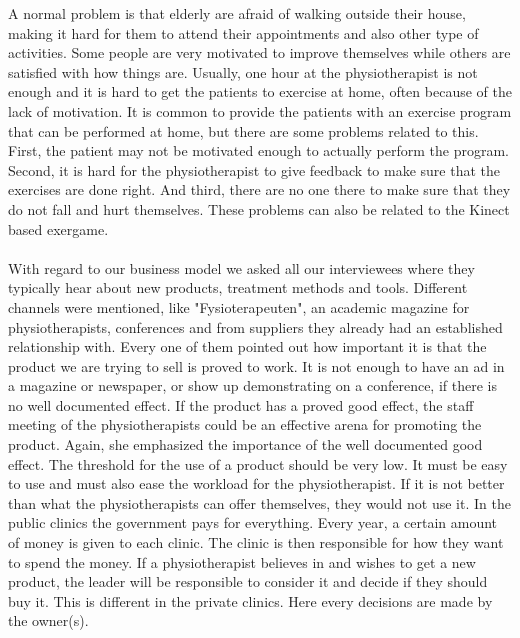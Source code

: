 A normal problem is that elderly are afraid of walking outside their house, making it hard for them to attend their appointments and also other type of activities. Some people are very motivated to improve themselves while others are satisfied with how things are. Usually, one hour at the physiotherapist is not enough and it is hard to get the patients to exercise at home, often because of the lack of motivation. It is common to provide the patients with an exercise program that can be performed at home, but there are some problems related to this. First, the patient may not be motivated enough to actually perform the program. Second, it is hard for the physiotherapist to give feedback to make sure that the exercises are done right. And third, there are no one there to make sure that they do not fall and hurt themselves. These problems can also be related to the Kinect based exergame.  \\ \\
With regard to our business model we asked all our interviewees where they typically hear about new products, treatment methods and tools. Different channels were mentioned, like "Fysioterapeuten", an academic magazine for physiotherapists, conferences and from suppliers they already had an established relationship with. Every one of them pointed out how important it is that the product we are trying to sell is proved to work. It is not enough to have an ad in a magazine or newspaper, or show up demonstrating on a conference, if there is no well documented effect. If the product has a proved good effect, the staff meeting of the physiotherapists could be an effective arena for promoting the product. Again, she emphasized the importance of the well documented good effect. The threshold for the use of a product should be very low. It must be easy to use and must also ease the workload for the physiotherapist. If it is not better than what the physiotherapists can offer themselves, they would not use it. In the public clinics the government pays for everything. Every year, a certain amount of money is given to each clinic. The clinic is then responsible for how they want to spend the money. If a physiotherapist believes in and wishes to get a new product, the leader will be responsible to consider it and decide if they should buy it. This is different in the private clinics. Here every decisions are made by the owner(s). \\ \\
